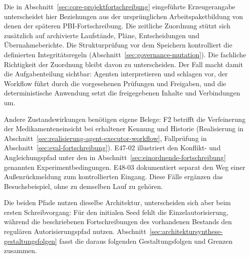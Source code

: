 \begin{samepage}
Die in Abschnitt~\ref{sec:core-projektfortschreibung} eingeführte
Erzeugerangabe unterscheidet hier Beziehungen aus der ursprünglichen
Arbeitspaketbildung von denen der späteren PBI-Fortschreibung.
Die zeitliche Zuordnung stützt sich zusätzlich auf archivierte
Laufstände, Pläne, Entscheidungen und Übernahmeberichte. Die Strukturprüfung vor
dem Speichern kontrolliert die definierten Integritätsregeln
(Abschnitt~\ref{sec:governance-mutation}). Die fachliche Richtigkeit
der Zuordnung bleibt davon zu unterscheiden. Der Fall macht damit
die Aufgabenteilung sichtbar: Agenten interpretieren und schlagen
vor, der Workflow führt durch die vorgesehenen Prüfungen und
Freigaben, und die deterministische Anwendung setzt die
freigegebenen Inhalte und Verbindungen um.
\par
\end{samepage}

Andere Zustandswirkungen benötigen eigene Belege: F2 betrifft die
Verfeinerung der Medikamenteneinsicht bei erhaltener Kennung und
Historie (Realisierung in
Abschnitt~\ref{sec:realisierung-agent-executor-workflow},
Fallprüfung in Abschnitt~\ref{sec:eval-fortschreibung}).
E47-02 illustriert den Konflikt- und Angleichungspfad unter den in
Abschnitt~\ref{sec:einordnende-fortschreibung} genannten
Experimentbedingungen. E48-03 dokumentiert separat den Weg einer
Außenrückmeldung zum kontrollierten Eingang. Diese Fälle ergänzen
das Besuchsbeispiel, ohne zu demselben Lauf zu gehören.

Die beiden Pfade nutzen dieselbe Architektur, unterscheiden sich
aber beim ersten Schreibvorgang: Für den initialen Seed fehlt die
Einzelautorisierung, während die beschriebenen Fortschreibungen
des vorhandenen Bestands den regulären Autorisierungspfad nutzen.
Abschnitt~\ref{sec:architektursynthese-gestaltungsfolgen} fasst die
daraus folgenden Gestaltungsfolgen und Grenzen zusammen.
